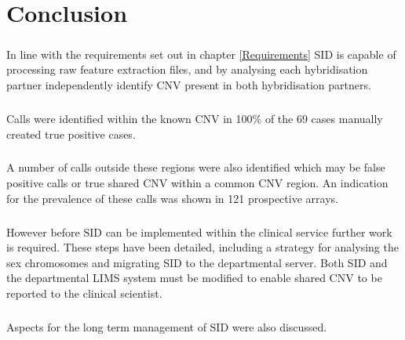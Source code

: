\chapter{Conclusion}\label{ch:Conclusion} 
\paragraph*{}
In line with the requirements set out in chapter \ref{Requirements} SID is capable of processing raw feature extraction files, and by analysing each hybridisation partner independently identify CNV present in both hybridisation partners. 
\paragraph*{}
Calls were identified within the known CNV in 100\% of the 69 cases manually created true positive cases.
\paragraph*{}
A number of calls outside these regions were also identified which may be false positive calls or true shared CNV within a common CNV region. An indication for the prevalence of these calls was shown in 121 prospective arrays.
\paragraph*{}
However before SID can be implemented within the clinical service further work is required. These steps have been detailed, including a strategy for analysing the sex chromosomes and migrating SID to the departmental server. Both SID and the departmental LIMS system must be modified to enable shared CNV to be reported to the clinical scientist.
\paragraph*{}
Aspects for the long term management of SID were also discussed.